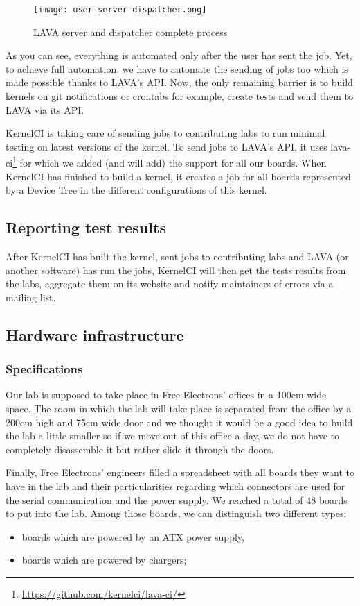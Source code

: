 \begin{figure}[H]
  \texttt{[image: user-server-dispatcher.png]}
  \caption{LAVA server and dispatcher complete process}
\end{figure}

As you can see, everything is automated only after the user has sent the job. Yet, to achieve full automation, we have to automate the sending of jobs too which is made possible thanks to LAVA's API. Now, the only remaining barrier is to build kernels on git notifications or crontabs for example, create tests and send them to LAVA via its API.

KernelCI is taking care of sending jobs to contributing labs to run minimal testing on latest versions of the kernel. To send jobs to LAVA's API, it uses lava-ci\footnote{\url{https://github.com/kernelci/lava-ci/}} for which we added (and will add) the support for all our boards. When KernelCI has finished to build a kernel, it creates a job for all boards represented by a Device Tree in the different configurations of this kernel.

\subsection{Reporting test results}

After KernelCI has built the kernel, sent jobs to contributing labs and LAVA (or another software) has run the jobs, KernelCI will then get the tests results from the labs, aggregate them on its website and notify maintainers of errors via a mailing list.

\subsection{Hardware infrastructure}

\subsubsection{Specifications}

Our lab is supposed to take place in Free Electrons' offices in a 100cm wide space. The room in which the lab will take place is separated from the office by a 200cm high and 75cm wide door and we thought it would be a good idea to build the lab a little smaller so if we move out of this office a day, we do not have to completely disassemble it but rather slide it through the doors.

Finally, Free Electrons' engineers filled a spreadsheet with all boards they want to have in the lab and their particularities regarding which connectors are used for the serial communication and the power supply. We reached a total of 48 boards to put into the lab. Among those boards, we can distinguish two different types:
\begin{itemize}
  \item boards which are powered by an ATX power supply,
  \item boards which are powered by chargers;
\end{itemize}

